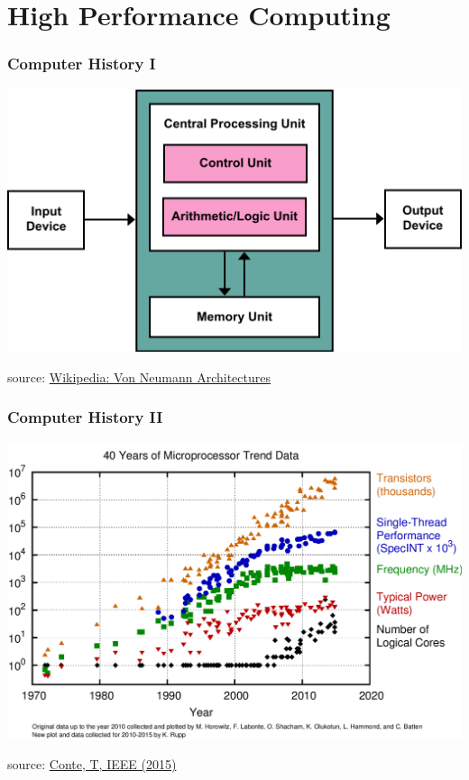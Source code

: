 \section{High Performance Computing}

\begin{frame}
    \frametitle{Computer History I}
    \includegraphics[width=\linewidth]{assets/von_neumann.png}

    source: \href{https://upload.wikimedia.org/wikipedia/commons/thumb/e/e5/Von_Neumann_Architecture.svg/}{Wikipedia: Von Neumann Architectures}
\end{frame}


\begin{frame}
    \frametitle{Computer History II}

    \includegraphics[width=\linewidth]{assets/dennard.png}

   source:  \href{https://arch2030.cs.washington.edu/slides/arch2030_tom_conte.pdf}{Conte, T, IEEE (2015)}
\end{frame}



